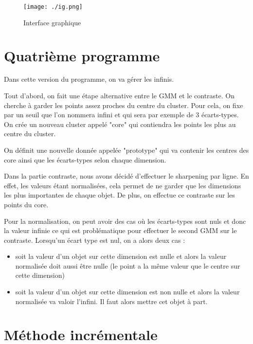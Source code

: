 \documentclass[a4paper,10pt]{article}
\begin{document}
\begin{figure}[h]
	\begin{center}
    	\texttt{[image: ./ig.png]}
	\end{center}
    \caption{Interface graphique}
\end{figure}

\newpage

\section{Quatrième programme}

Dans cette version du programme, on va gérer les infinis.

Tout d'abord, on fait une étape alternative entre le GMM et le contraste. On cherche à garder les points assez proches du centre du cluster. Pour cela, on fixe par un seuil que l'on nommera infini et qui sera par exemple de 3 écarts-types. On crée un nouveau cluster appelé "core" qui contiendra les points les plus au centre du cluster.

On définit une nouvelle donnée appelée "prototype" qui va contenir les centres des core ainsi que les écarts-types selon chaque dimension.

Dans la partie contraste, nous avons décidé d'effectuer le sharpening par ligne. En effet, les valeurs étant normalisées, cela permet de ne garder que les dimensions les plus importantes de chaque objet. De plus, on effectue ce contraste sur les points du core.

Pour la normalisation, on peut avoir des cas où les écarts-types sont nuls et donc la valeur infinie ce qui est problématique pour effectuer le second GMM sur le contraste. Lorsqu'un écart type est nul, on a alors deux cas :
\begin{itemize}
 \item soit la valeur d'un objet sur cette dimension est nulle et alors la valeur normalisée doit aussi être nulle (le point a la même valeur que le centre sur cette dimension)
 \item soit la valeur d'un objet sur cette dimension est non nulle et alors la valeur normalisée va valoir l'infini. Il faut alors mettre cet objet à part.
\end{itemize}


\section{Méthode incrémentale}
\end{document}
